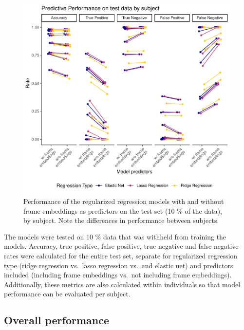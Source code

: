 \documentclass[
  man]{apa6}
\begin{document}
\begin{figure}
\includegraphics[width=0.95\linewidth]{FinalReport_files/figure-latex/fit-ID-1} \caption{Performance of the regularized regression models with and without frame embeddings as predictors on the test set (10 \% of the data), by subject. Note the differences in performance between subjects.}\label{fig:fit-ID}
\end{figure}

The models were tested on 10 \% data that was withheld from training the models. Accuracy, true positive, false positive, true negative and false negative rates were calculated for the entire test set, separate for regularized regression type (ridge regression vs.~lasso regression vs.~and elastic net) and predictors included (including frame embeddings vs.~not including frame embeddings). Additionally, these metrics are also calculated within individuals so that model performance can be evaluated per subject.

\hypertarget{overall-performance}{%
\subsection{Overall performance}\label{overall-performance}}
\end{document}
